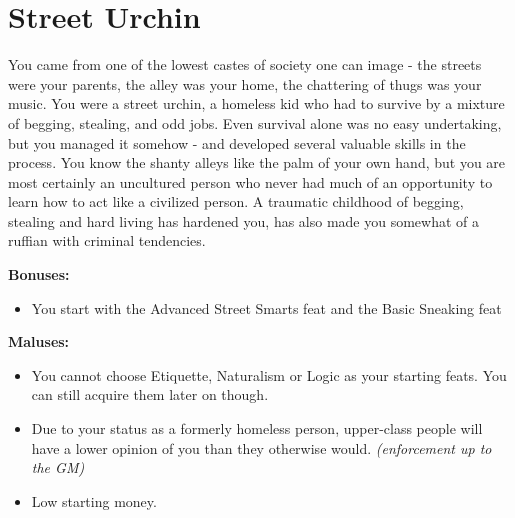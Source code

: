\section{Street Urchin}
You came from one of the lowest castes of society one can image - the streets were your parents, the alley was your home, the chattering of thugs was your music. You were a street urchin, a homeless kid who had to survive by a mixture of begging, stealing, and odd jobs. Even survival alone was no easy undertaking, but you managed it somehow - and developed several valuable skills in the process. You know the shanty alleys like the palm of your own hand, but you are most certainly an uncultured person who never had much of an opportunity to learn how to act like a civilized person. A traumatic childhood of begging, stealing and hard living has hardened you, has also made you somewhat of a ruffian with criminal tendencies.


\textbf{Bonuses:}
\begin{itemize}
	\item You start with the Advanced Street Smarts feat and the Basic Sneaking feat
\end{itemize}


\textbf{Maluses:}
\begin{itemize}
	\item You cannot choose Etiquette, Naturalism or Logic as your starting feats. You can still acquire them later on though.
	\item Due to your status as a formerly homeless person, upper-class people will have a lower opinion of you than they otherwise would. \textit{(enforcement up to the GM)}
	\item Low starting money.
\end{itemize}
